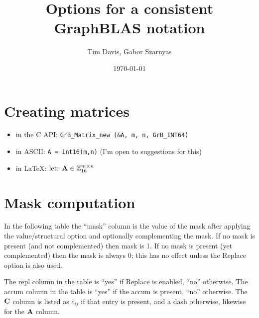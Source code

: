 \documentclass[11pt]{article}
\title{Options for a consistent GraphBLAS notation}
\author{Tim Davis, Gabor Szarnyas}
\date{\today}
\begin{document}
\maketitle

\section{Creating matrices}

\begin{itemize}
\item[] in the C API: \verb'GrB_Matrix_new (&A, m, n, GrB_INT64)'
\item[] in ASCII: \verb'A = int16(m,n)' (I'm open to suggestions for this)
\item[] in LaTeX: $\mbox{let: } {\bf A} \in \mathbb{Z}^{m \times n}_{16}$
\end{itemize}

\section{Mask computation}

In the following table the ``mask'' column is the value of the
mask after applying the value/structural option and optionally
complementing the mask.  If no mask is present (and not complemented)
then mask is 1.  If no mask is present (yet complemented) then the mask is
always 0; this has no effect unless the Replace option is also used.

The repl column in the table is ``yes'' if Replace is enabled, ``no'' otherwise.
The accum column in the table is ``yes'' if the accum is 
present, ``no'' otherwise.
The ${\bf C}$ column is listed as $c_{ij}$ if that entry is present,
and a dash otherwise, likewise for the ${\bf A}$ column.
\end{document}

